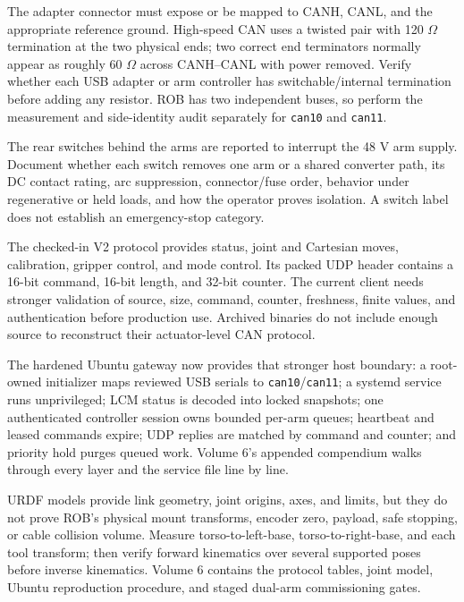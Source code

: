 \documentclass[10pt,openany]{book}
\begin{document}
\ROBCANPhysicalDiagram

The adapter connector must expose or be mapped to CANH, CANL, and the appropriate reference ground. High-speed CAN uses a twisted pair with 120 $\Omega$ termination at the two physical ends; two correct end terminators normally appear as roughly 60 $\Omega$ across CANH--CANL with power removed. Verify whether each USB adapter or arm controller has switchable/internal termination before adding any resistor. ROB has two independent buses, so perform the measurement and side-identity audit separately for \texttt{can10} and \texttt{can11}.

The rear switches behind the arms are reported to interrupt the 48 V arm supply. Document whether each switch removes one arm or a shared converter path, its DC contact rating, arc suppression, connector/fuse order, behavior under regenerative or held loads, and how the operator proves isolation. A switch label does not establish an emergency-stop category.

The checked-in V2 protocol provides status, joint and Cartesian moves, calibration, gripper control, and mode control. Its packed UDP header contains a 16-bit command, 16-bit length, and 32-bit counter. The current client needs stronger validation of source, size, command, counter, freshness, finite values, and authentication before production use. Archived binaries do not include enough source to reconstruct their actuator-level CAN protocol.

The hardened Ubuntu gateway now provides that stronger host boundary: a root-owned initializer maps reviewed USB serials to \texttt{can10}/\texttt{can11}; a systemd service runs unprivileged; LCM status is decoded into locked snapshots; one authenticated controller session owns bounded per-arm queues; heartbeat and leased commands expire; UDP replies are matched by command and counter; and priority hold purges queued work. Volume 6's appended compendium walks through every layer and the service file line by line.

URDF models provide link geometry, joint origins, axes, and limits, but they do not prove ROB's physical mount transforms, encoder zero, payload, safe stopping, or cable collision volume. Measure torso-to-left-base, torso-to-right-base, and each tool transform; then verify forward kinematics over several supported poses before inverse kinematics. Volume 6 contains the protocol tables, joint model, Ubuntu reproduction procedure, and staged dual-arm commissioning gates.
\end{document}
